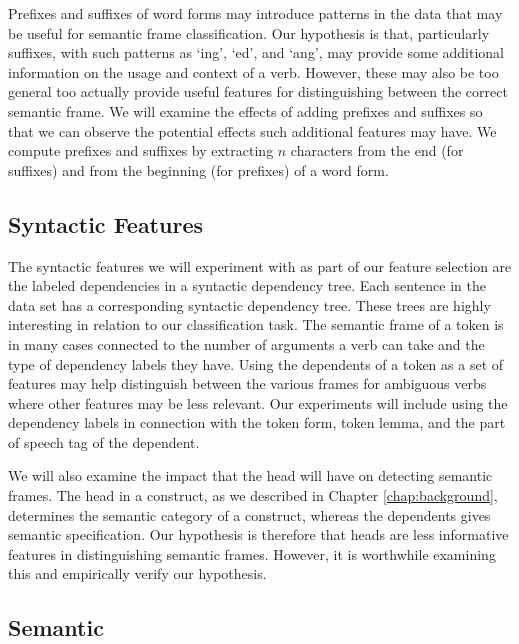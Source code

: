 Prefixes and suffixes of word forms may introduce patterns in the data that may be useful for semantic frame classification. Our hypothesis is that, particularly suffixes, with such patterns as `ing', `ed', and `ang', may provide some additional information on the usage and context of a verb. However, these may also be too general too actually provide useful features for distinguishing between the correct semantic frame. We will examine the effects of adding prefixes and suffixes so that we can observe the potential effects such additional features may have. We compute prefixes and suffixes by extracting $n$ characters from the end (for suffixes) and from the beginning (for prefixes) of a word form.

\subsection{Syntactic Features}

The syntactic features we will experiment with as part of our feature selection are the labeled dependencies in a syntactic dependency tree. Each sentence in the data set has a corresponding syntactic dependency tree. These trees are highly interesting in relation to our classification task. The semantic frame of a token is in many cases connected to the number of arguments a verb can take and the type of dependency labels they have. Using the dependents of a token as a set of features may help distinguish between the various frames for ambiguous verbs where other features may be less relevant. Our experiments will include using the dependency labels in connection with the token form, token lemma, and the part of speech tag of the dependent.

We will also examine the impact that the head will have on detecting semantic frames. The head in a construct, as we described in Chapter \ref{chap:background}, determines the semantic category of a construct, whereas the dependents gives semantic specification. Our hypothesis is therefore that heads are less informative features in distinguishing semantic frames. However, it is worthwhile examining this and empirically verify our hypothesis.


\subsection{Semantic}


